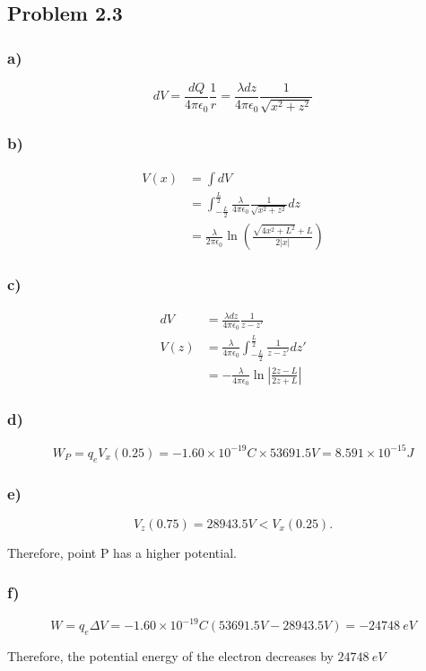 \documentclass[../homework.tex]{subfiles}
\begin{document}
\subsection{Problem 2.3}
\subsubsection*{a)}
\begin{equation*}
    dV = \frac{dQ}{4 \pi \epsilon_0} \frac{1}{r} = \frac{\lambda dz}{4 \pi \epsilon_0} \frac{1}{\sqrt{x^2 + z^2}}
\end{equation*}

\subsubsection*{b)}
\begin{align*}
    V(x) & = \int dV                                                                                          \\
         & = \int_{-\frac{L}{2}}^{\frac{L}{2}} \frac{\lambda}{4 \pi \epsilon_0} \frac{1}{\sqrt{x^2 + z^2}} dz \\
         & = \frac{\lambda}{2 \pi \epsilon_0} \ln \left(
    \frac{\sqrt{4x^2+L^2} + L}{2|x|}
    \right)
\end{align*}

\subsubsection*{c)}
\begin{align*}
    dV   & = \frac{\lambda dz}{4 \pi \epsilon_0} \frac{1}{z - z'}                                    \\
    V(z) & = \frac{\lambda}{4 \pi \epsilon_0} \int_{-\frac{L}{2}}^{\frac{L}{2}} \frac{1}{z - z'} dz' \\
         & = -\frac{\lambda}{4 \pi \epsilon_0} \ln \left|
    \frac{2z-L}{2z+L}
    \right|
\end{align*}

\subsubsection*{d)}
\begin{equation*}
    W_{P} = q_e V_x(0.25) = -1.60 \times 10^{-19}C \times 53691.5V = 8.591 \times 10^{-15}J
\end{equation*}

\subsubsection*{e)}
\begin{equation*}
    V_z(0.75) = 28943.5V < V_x(0.25).
\end{equation*}

Therefore, point P has a higher potential.

\subsubsection*{f)}
\begin{equation*}
    W = q_e \Delta V = -1.60\times 10^{-19}C (53691.5V - 28943.5V) = -24748~eV
\end{equation*}

Therefore, the potential energy of the electron decreases by $24748~eV$
\end{document}
